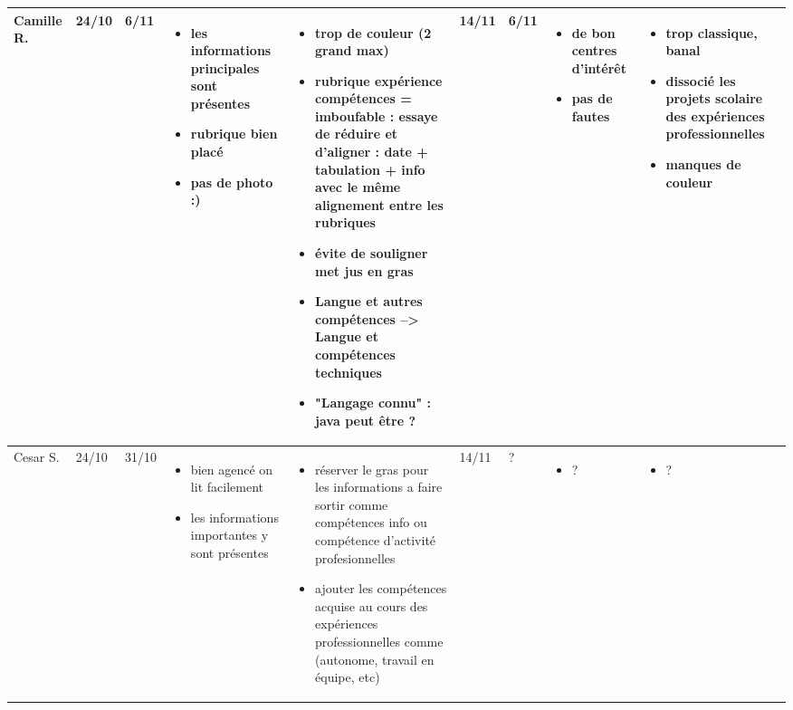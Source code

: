 \documentclass[a4paper,11pt]{article}
\begin{document}
\begin{landscape}
\begin{longtable}{|l|l|l|p{4cm}|p{4cm}|l|l|p{4cm}|p{4cm}|}
    Camille R. 	& 24/10 & 6/11
				& \begin{itemize}
				  \item les informations principales sont présentes
				  \item rubrique bien placé
				  \item pas de photo :)
				  \end{itemize}
				& \begin{itemize}
				  \item trop de couleur (2 grand max)
				  \item rubrique expérience compétences = imboufable : essaye de réduire et d'aligner : date + tabulation + info avec le même alignement entre les rubriques
				  \item évite de souligner met jus en gras
				  \item Langue et autres compétences --> Langue et compétences techniques
				  \item "Langage  connu" : java peut être ?
				  \end{itemize}
				& 14/11 & 6/11
				& \begin{itemize}
				  \item de bon centres d'intérêt
				  \item pas de fautes
				  \end{itemize}
				& \begin{itemize}
				  \item trop classique, banal
				  \item dissocié les projets scolaire des expériences professionnelles
				  \item manques de couleur
				  \end{itemize} \\ \hline

    Cesar S.  & 24/10 & 31/10 %
			  & \begin{itemize}
				\item bien agencé on lit facilement
				\item les informations importantes y sont présentes
				\end{itemize}
			  & \begin{itemize}
				\item réserver le gras pour les informations a faire sortir comme compétences info ou compétence d'activité profesionnelles
				\item ajouter les compétences acquise au cours des expériences professionnelles comme (autonome, travail en équipe, etc)
				\end{itemize}
			  & 14/11 & ?
			  & \begin{itemize}
				\item ?
				\end{itemize}
			  & \begin{itemize}
				\item ?
				\end{itemize} \\ \hline


\end{longtable}
\end{landscape}
\end{document}
